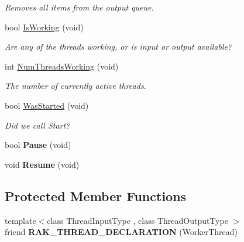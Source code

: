 \begin{DoxyCompactItemize}
\begin{DoxyCompactList}\small\item\em Removes all items from the output queue. \end{DoxyCompactList}\item 
\hypertarget{struct_thread_pool_a90b37c13ba8b9f67db4bd99ee4a5d811}{bool \hyperlink{struct_thread_pool_a90b37c13ba8b9f67db4bd99ee4a5d811}{Is\-Working} (void)}\label{struct_thread_pool_a90b37c13ba8b9f67db4bd99ee4a5d811}

\begin{DoxyCompactList}\small\item\em Are any of the threads working, or is input or output available? \end{DoxyCompactList}\item 
\hypertarget{struct_thread_pool_aad431a8d3f28af0ae5249c7e3b819307}{int \hyperlink{struct_thread_pool_aad431a8d3f28af0ae5249c7e3b819307}{Num\-Threads\-Working} (void)}\label{struct_thread_pool_aad431a8d3f28af0ae5249c7e3b819307}

\begin{DoxyCompactList}\small\item\em The number of currently active threads. \end{DoxyCompactList}\item 
\hypertarget{struct_thread_pool_a531920221fd17dce38b5da74b56f2eff}{bool \hyperlink{struct_thread_pool_a531920221fd17dce38b5da74b56f2eff}{Was\-Started} (void)}\label{struct_thread_pool_a531920221fd17dce38b5da74b56f2eff}

\begin{DoxyCompactList}\small\item\em Did we call Start? \end{DoxyCompactList}\item 
\hypertarget{struct_thread_pool_a870e8e68979a7b0f1cc5b0fda7044a49}{bool {\bfseries Pause} (void)}\label{struct_thread_pool_a870e8e68979a7b0f1cc5b0fda7044a49}

\item 
\hypertarget{struct_thread_pool_a16261d79beca0692cc4aa97ec204fd6d}{void {\bfseries Resume} (void)}\label{struct_thread_pool_a16261d79beca0692cc4aa97ec204fd6d}

\end{DoxyCompactItemize}
\subsection*{Protected Member Functions}
\begin{DoxyCompactItemize}
\item 
\hypertarget{struct_thread_pool_a6f77f4d6ec9d6f207f16fdb79b54fe2a}{{\footnotesize template$<$class Thread\-Input\-Type , class Thread\-Output\-Type $>$ }\\friend {\bfseries R\-A\-K\-\_\-\-T\-H\-R\-E\-A\-D\-\_\-\-D\-E\-C\-L\-A\-R\-A\-T\-I\-O\-N} (Worker\-Thread)}\label{struct_thread_pool_a6f77f4d6ec9d6f207f16fdb79b54fe2a}

\end{DoxyCompactItemize}
